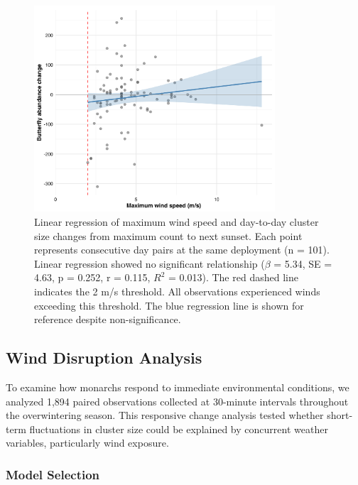 \begin{figure}[htbp]
    \centering
    \includegraphics[width=0.8\textwidth]{supplemental/results/sunset/figures/wind_vs_change_bivariate_untransformed.png}
    \caption[Wind speed vs. cluster size changes (day-to-day)]{Linear regression of maximum wind speed and day-to-day cluster size changes from maximum count to next sunset. Each point represents consecutive day pairs at the same deployment (n = 101). Linear regression showed no significant relationship ($\beta$ = 5.34, SE = 4.63, p = 0.252, r = 0.115, $R^2$ = 0.013). The red dashed line indicates the 2 m/s threshold. All observations experienced winds exceeding this threshold. The blue regression line is shown for reference despite non-significance.}
    \label{fig:wind_linear_regression_sunset}
\end{figure}

\subsection{Wind Disruption Analysis}

To examine how monarchs respond to immediate environmental conditions, we analyzed 1,894 paired observations collected at 30-minute intervals throughout the overwintering season. This responsive change analysis tested whether short-term fluctuations in cluster size could be explained by concurrent weather variables, particularly wind exposure.

\subsubsection{Model Selection}

